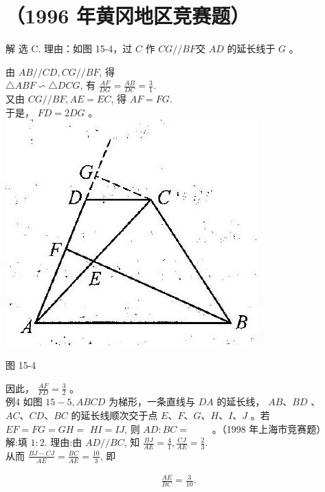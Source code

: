 \documentclass[10pt]{article}
\begin{document}
\section*{（1996 年黄冈地区竞赛题）}
解 选 C. 理由：如图 15-4，过 $C$ 作 $C G / / B F$交 $A D$ 的延长线于 $G$ 。

由 $A B / / C D, C G / / B F$, 得\\
$\triangle A B F \backsim \triangle D C G$, 有 $\frac{A F}{D G}=\frac{A B}{D C}=\frac{3}{1}$.\\
又由 $C G / / B F, A E=E C$, 得 $A F=F G$.\\
于是， $F D=2 D G$ 。\\
\includegraphics[max width=\textwidth, center]{2024_10_30_2c8f45efd4a519b08e1ag-139(1)}

图 15-4

因此， $\frac{A F}{F D}=\frac{3}{2}$ 。\\
例4 如图 $15-5, A B C D$ 为梯形，一条直线与 $D A$ 的延长线， $A B 、 B D$ 、 $A C 、 C D 、 B C$ 的延长线顺次交于点 $E 、 F 、 G 、 H 、 I 、 J$ 。若 $E F=F G=G H=$ $H I=I J$, 则 $A D: B C=$ $\qquad$。（1998 年上海市竞赛题）\\
解:填 $1: 2$. 理由:由 $A D / / B C$, 知 $\frac{B J}{A E}=\frac{4}{1}, \frac{C J}{A E}=\frac{2}{3}$.\\
从而 $\frac{B J-C J}{A E}=\frac{B C}{A E}=\frac{10}{3}$, 即

\begin{align*}
\frac{A E}{B C}=\frac{3}{10} .
\end{align*}
\end{document}
